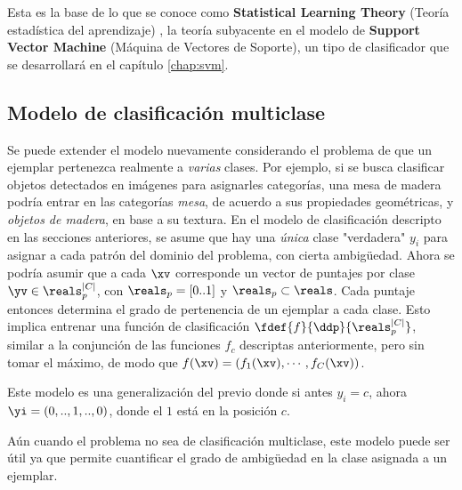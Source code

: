 Esta es la base de lo que se conoce como \textbf{Statistical Learning Theory}  (Teoría estadística del aprendizaje) \cite{vapnik1998,mostafa2012}, la teoría subyacente en el modelo de \textbf{Support Vector Machine} (Máquina de Vectores de Soporte), un tipo de clasificador que se desarrollará en el capítulo \ref{chap:svm}.




\subsection{Modelo de clasificación multiclase}

\newcommand{\RPC}{\reals_p^{|C|}}
\newcommand{\RP}{\reals_p=[0..1]}

Se puede extender el modelo nuevamente considerando el problema de que un ejemplar pertenezca realmente a \textit{varias} clases. Por ejemplo, si se busca clasificar objetos detectados en imágenes para asignarles categorías, una mesa de madera podría entrar en las categorías \textit{mesa}, de acuerdo a sus propiedades geométricas, y \textit{objetos de madera}, en base a su textura. En el modelo de clasificación descripto en las secciones anteriores, se asume que hay una \textit{única} clase "verdadera" $y_i$ para asignar a cada patrón del dominio del problema, con cierta ambigüedad. Ahora se podría asumir que a cada $\xv$ corresponde un vector de puntajes por clase $\yv \in \RPC$, con $\RP$ y $\reals_p \subset \reals$. Cada puntaje entonces determina el grado de pertenencia de un ejemplar a cada clase. Esto implica entrenar una función de clasificación $\fdef{f}{\ddp}{\RPC} $, similar a la conjunción de las funciones $f_c$ descriptas anteriormente, pero sin tomar el máximo, de modo que $f(\xv)=(f_1(\xv),\cdots,f_C(\xv))$.

Este modelo es una generalización del previo donde si antes $y_i=c$, ahora $\yi= (0,..,1,..,0)$, donde el $1$ está en la posición $c$. 

Aún cuando el problema no sea de clasificación multiclase, este modelo puede ser útil ya que permite cuantificar el grado de ambigüedad en la clase asignada a un ejemplar.

